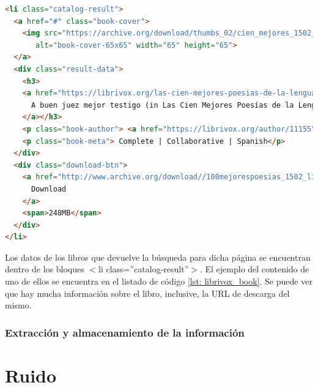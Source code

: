 \begin{lstlisting}[basicstyle=\tiny\ttfamily, language=html, caption={Ejemplo de la información contenida para uno de los libros},captionpos=b, label={lst: librivox_book}]
<li class="catalog-result">
  <a href="#" class="book-cover">
    <img src="https://archive.org/download/thumbs_02/cien_mejores_1502_thumb.jpg"
       alt="book-cover-65x65" width="65" height="65">
  </a>
  <div class="result-data">
    <h3>
    <a href="https://librivox.org/las-cien-mejores-poesias-de-la-lengua-castellana-by-marcelino-menendez-y-pelayo/">
      A buen juez mejor testigo (in Las Cien Mejores Poesías de la Lengua Castellana )
    </a></h3>
    <p class="book-author"> <a href="https://librivox.org/author/11155">José ZORRILLA Y MORAL (1817 - 1893)</a> </p>
    <p class="book-meta"> Complete | Collaborative | Spanish</p>
  </div>	
  <div class="download-btn">
    <a href="http://www.archive.org/download//100mejorespoesias_1502_librivox/100mejorespoesias_1502_librivox_64kb_mp3.zip">
      Download
    </a>
    <span>248MB</span>
  </div>
</li>
\end{lstlisting}
Los datos de los libros que devuelve la búsqueda para dicha página se encuentran dentro de los bloques \textcolor{editorBlue}{$<$}\textcolor{editorPink}{li class}\textcolor{editorBlue}{=}\textcolor{editorPurple}{''catalog-result''}\textcolor{editorBlue}{$>$}. El ejemplo del contenido de uno de ellos se encuentra en el listado de código \ref{lst: librivox_book}. Se puede ver que hay mucha información sobre el libro, inclusive, la \gls{URL} de descarga del mismo.
\subsubsection{Extracción y almacenamiento de la información}

\section{Ruido}
